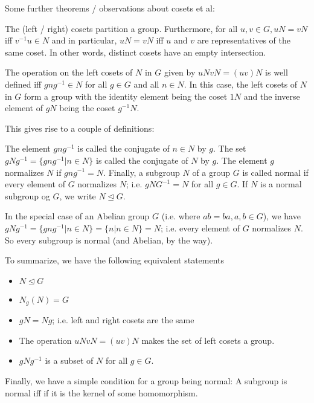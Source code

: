 
Some further theorems / observations about cosets et al:

The (left / right) cosets partition a group. Furthermore, for all $u,v \in G, uN = vN$ iff $v^{-1}u \in N$ and in particular, $uN = vN$ iff $u$ and $v$ are representatives of the same coset. In other words, distinct cosets have an empty intersection.

The operation on the left cosets of $N$ in $G$ given by $uN vN = (uv)N$ is well defined iff $gng^{-1} \in N$ for all $g \in G$ and all $n \in N$. In this case, the left cosets of $N$ in $G$ form a group with the identity element being the coset $1N$ and the inverse element of $gN$ being the coset $g^{-1}N$. 

This gives rise to a couple of definitions:

The element $gng^{-1}$ is called the conjugate of $n \in N$ by $g$. The set $gNg^{-1} = \{ gng^{-1} | n \in N\}$ is called the conjugate of $N$ by $g$. The element $g$ normalizes $N$ if $gng^{-1} = N$. Finally, a subgroup $N$ of a group $G$ is called normal if every element of $G$ normalizes $N$; i.e. $gNG^{-1} = N$ for all $g \in G$. If $N$ is a normal subgroup og $G$, we write $N \trianglelefteq G$.

In the special case of an Abelian group $G$ (i.e. where $ab = ba, a,b \in G$), we have $gNg^{-1} = \{gng^{-1} | n \in N \} = \{n |n \in N\} = N$; i.e. every element of $G$ normalizes $N$. So every subgroup is normal (and Abelian, by the way).

To summarize, we have the following equivalent statements

\begin{itemize}

\item $N \trianglelefteq G$

\item $N_g(N) = G$

\item $gN = Ng$; i.e. left and right cosets are the same

\item The operation $uN vN = (uv)N$ makes the set of left cosets a group.

\item $gNg^{-1}$ is a subset of $N$ for all $g \in G$.

\end{itemize}

Finally, we have a simple condition for a group being normal: A subgroup is normal iff if it is the kernel of some homomorphism.

